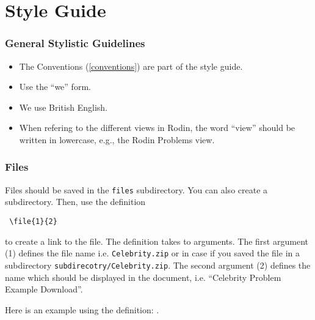 \section{Style Guide}
\label{style-guide}


\subsubsection{General Stylistic Guidelines}

\begin{itemize}
	\item The Conventions (\ref{conventions}) are part of the style guide.

	\item Use the ``we'' form.

	\item We use British English.

	\item When refering to the different views in Rodin, the word ``view'' should be written in lowercase, e.g., the Rodin Problems view.
\end{itemize}

\subsubsection{Files}

Files should be saved in the \texttt{files} subdirectory. You can also create a subdirectory. Then, use the definition 

\begin{verbatim} \file{1}{2} 
\end{verbatim} 

to create a link to the file. The definition takes to arguments. The first argument (1) defines the file name i.e. \texttt{Celebrity.zip} or in case if you saved the file in a subdirectory \texttt{subdirecotry/Celebrity.zip}. The second argument (2) defines the name which should be displayed in the document, i.e. ``Celebrity Problem Example Download''.


Here is an example using the definition: .


